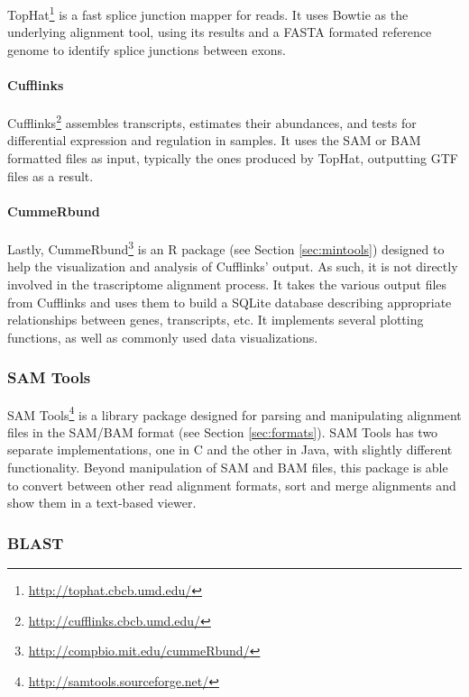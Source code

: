 TopHat\footnote{\url{http://tophat.cbcb.umd.edu/}} is a fast splice junction
mapper for \rnaseq{} reads. It uses Bowtie as the underlying alignment tool,
using its results and a FASTA formated reference genome to identify splice
junctions between exons.

\paragraph{Cufflinks}

Cufflinks\footnote{\url{http://cufflinks.cbcb.umd.edu/}} assembles transcripts,
estimates their abundances, and tests for differential expression and regulation
in \rnaseq{} samples. It uses the SAM or BAM formatted files as input, typically
the ones produced by TopHat, outputting GTF files as a result.

\paragraph{CummeRbund}

Lastly, CummeRbund\footnote{\url{http://compbio.mit.edu/cummeRbund/}} is an R
package (see Section \ref{sec:mintools}) designed to help the visualization and
analysis of Cufflinks' \rnaseq{} output. As such, it is not directly involved in
the trascriptome alignment process. It takes the various output files from
Cufflinks and uses them to build a SQLite database describing appropriate
relationships between genes, transcripts, etc. It implements several plotting
functions, as well as commonly used data visualizations.

\subsubsection*{SAM Tools}

SAM Tools\footnote{\url{http://samtools.sourceforge.net/}} is a library 
package designed for parsing and manipulating alignment files in the SAM/BAM
format \cite{Li2009} (see Section \ref{sec:formats}). SAM Tools has two separate
implementations, one in C and the other in Java, with slightly different
functionality. Beyond manipulation of SAM and BAM files, this package is able to
convert between other read alignment formats, sort and merge alignments and show
them in a text-based viewer.

\subsubsection*{BLAST}

